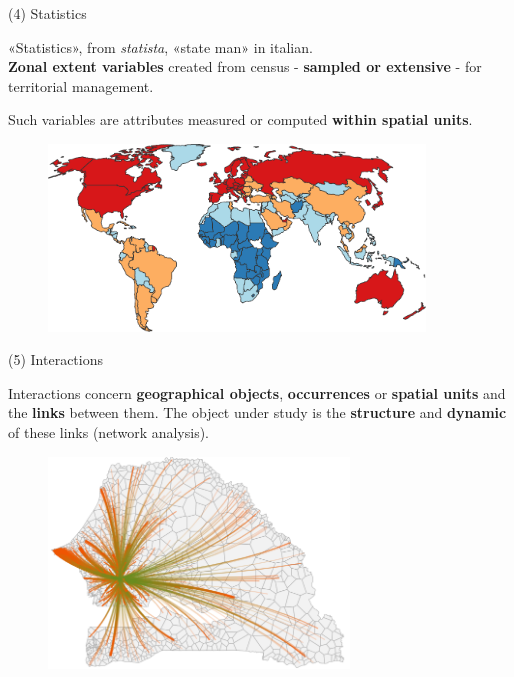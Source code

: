\begin{frame}{(4) Statistics}

«Statistics», from \textit{statista}, «state man»  in italian. \\
\textbf{Zonal extent variables} created from census - \textbf{sampled or extensive} - for territorial management.

Such variables are attributes measured or computed \textbf{within spatial units}.

\begin{figure}
  \includegraphics[width=10cm]{World.pdf}
\end{figure}

\end{frame}


\begin{frame}{(5) Interactions}

Interactions concern  \textbf{geographical objects},  \textbf{occurrences} or  \textbf{spatial units} and the \textbf{links} between them.
The object under study is the \textbf{structure} and \textbf{dynamic} of these links (network analysis).

\begin{figure}
  \includegraphics[width=8cm]{Interaction.png}
\end{figure}

\end{frame}




